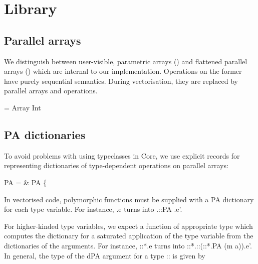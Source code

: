 \documentclass{article}
\begin{document}
\section*{Library}

\subsection*{Parallel arrays}

We distinguish between user-visible, parametric arrays (\<\pparr{\cdot}\>) and 
flattened parallel arrays (\<\parr{\cdot}\>) which are internal to our
implementation. Operations on the former have purely sequential semantics.
During vectorisation, they are replaced by parallel arrays and operations.

\begin{haskell}
\Data \pparr{\alpha} = Array Int \alpha  {} \\
\DataF \parr{\alpha}
\end{haskell}

\subsection*{\<PA\> dictionaries}

To avoid problems with using typeclasses in Core, we use explicit records for
representing dictionaries of type-dependent operations on parallel arrays:

\begin{haskell}
\Data PA \alpha = & PA \{
\end{haskell}

In vectorised code, polymorphic functions must be supplied with a \<PA\>
dictionary for each type variable. For instance, \<\Lambda\alpha.e\> turns
into \<\Lambda\alpha.::PA \alpha.e'\>.

For higher-kinded type variables, we expect a function of appropriate type
which computes the dictionary for a saturated application of the type
variable from the dictionaries of the arguments. For instance,
\<::{*}\to{*}.e\> turns into
\<::{*}\to{*}.::(\forall\alpha::{*}.PA \alpha{}
(m a)).e'\>.
In general, the type of the \<dPA\> argument for a type \<\sigma::\kappa\> is
given by
\end{document}
